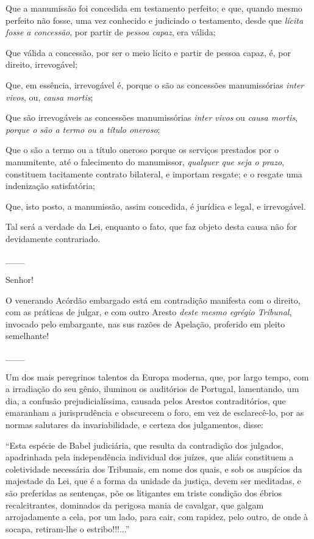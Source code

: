 Que a manumissão foi concedida em testamento perfeito; e que, quando
mesmo perfeito não fosse, uma vez conhecido e judiciado o testamento,
desde que \emph{lícita fosse a concessão}, por partir de \emph{pessoa
capaz}, era válida;

Que válida a concessão, por ser o meio lícito e partir de pessoa capaz,
é, por direito, irrevogável;

Que, em essência, irrevogável é, porque o são as concessões
manumissórias \emph{inter vivos}, ou, \emph{causa mortis};

Que são irrevogáveis as concessões manumissórias \emph{inter vivos} ou
\emph{causa mortis}, \emph{porque o são a termo ou a título oneroso};

Que o são a termo ou a título oneroso porque os serviços prestados por o
manumitente, até o falecimento do manumissor, \emph{qualquer que seja o
prazo}, constituem tacitamente contrato bilateral, e importam resgate; e
o resgate uma indenização satisfatória;

Que, isto posto, a manumissão, assim concedida, é jurídica e legal, e
irrevogável.

Tal será a verdade da Lei, enquanto o fato, que faz objeto desta causa
não for devidamente contrariado.

\_\_\_

Senhor!

O venerando Acórdão embargado está em contradição manifesta com o
direito, com as práticas de julgar, e com outro Aresto \emph{deste mesmo
egrégio Tribunal}, invocado pelo embargante, nas sus razões de Apelação,
proferido em pleito semelhante!

\_\_\_

Um dos mais peregrinos talentos da Europa moderna, que, por largo tempo,
com a irradiação do seu gênio, iluminou os auditórios de Portugal,
lamentando, um dia, a confusão prejudicialíssima, causada pelos Arestos
contraditórios, que emaranham a jurisprudência e obscurecem o foro, em
vez de esclarecê-lo, por as normas salutares da invariabilidade, e
certeza dos julgamentos, disse:

``Esta espécie de Babel judiciária, que resulta da contradição dos
julgados, apadrinhada pela independência individual dos juízes, que
aliás constituem a coletividade necessária dos Tribunais, em nome dos
quais, e sob os auspícios da majestade da Lei, que é a forma da unidade
da justiça, devem ser meditadas, e são preferidas as sentenças, põe os
litigantes em triste condição dos ébrios recalcitrantes, dominados da
perigosa mania de cavalgar, que galgam arrojadamente a cela, por um
lado, para cair, com rapidez, pelo outro, de onde à socapa, retiram-lhe
o estribo!!!...''

